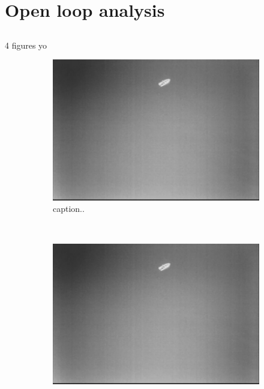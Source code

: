 \section{Open loop analysis}

\subsection{}
4 figures yo
\begin{figure}[ht]
	\centering
	\begin{subfigure}[b]{0.45\textwidth}
		\includegraphics[width=\textwidth]{fig1}
		\caption{caption..}
		\label{fig:2a}
	\end{subfigure}
	~ %
	\begin{subfigure}[b]{0.45\textwidth}
		\includegraphics[width=\textwidth]{fig1}

\end{subfigure}
\end{figure}
